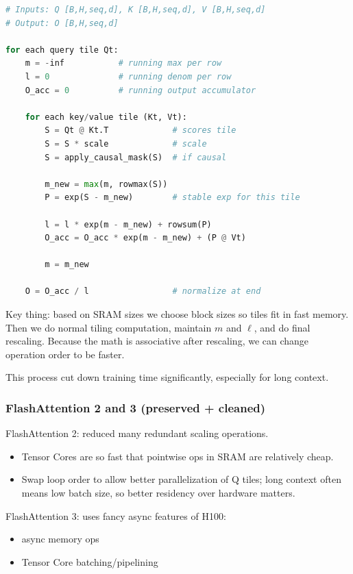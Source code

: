 \documentclass[11pt]{article}
\newcommand{\blue}[1]{\textcolor{myblue}{#1}}
\begin{document}
\begin{lstlisting}[language=Python, caption={FlashAttention-style tiled attention (high-level pseudocode)}]
# Inputs: Q [B,H,seq,d], K [B,H,seq,d], V [B,H,seq,d]
# Output: O [B,H,seq,d]

for each query tile Qt:
    m = -inf           # running max per row
    l = 0              # running denom per row
    O_acc = 0          # running output accumulator

    for each key/value tile (Kt, Vt):
        S = Qt @ Kt.T             # scores tile
        S = S * scale             # scale
        S = apply_causal_mask(S)  # if causal

        m_new = max(m, rowmax(S))
        P = exp(S - m_new)        # stable exp for this tile

        l = l * exp(m - m_new) + rowsum(P)
        O_acc = O_acc * exp(m - m_new) + (P @ Vt)

        m = m_new

    O = O_acc / l                 # normalize at end
\end{lstlisting}

Key thing: based on SRAM sizes we choose block sizes so tiles fit in fast memory. Then we do normal tiling computation, maintain $m$ and $\ell$, and do final rescaling. Because the math is associative after rescaling, we can change operation order to be faster.

This process cut down training time significantly, especially for long context.

\subsubsection*{\blue{FlashAttention 2 and 3 (preserved + cleaned)}}
FlashAttention 2: reduced many redundant scaling operations.
\begin{itemize}
\item Tensor Cores are so fast that pointwise ops in SRAM are relatively cheap.
\item Swap loop order to allow better parallelization of Q tiles; long context often means low batch size, so better residency over hardware matters.
\end{itemize}

FlashAttention 3: uses fancy async features of H100:
\begin{itemize}
\item async memory ops
\item Tensor Core batching/pipelining
\end{itemize}
\end{document}
